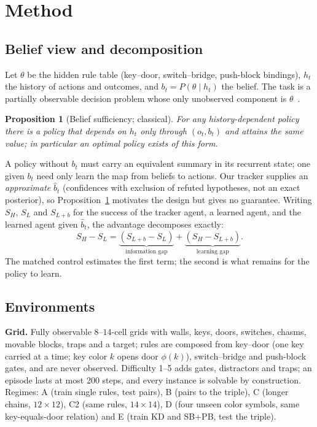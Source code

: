 \documentclass[conference]{IEEEtran}
\newtheorem{proposition}{Proposition}
\begin{document}
\section{Method}
\subsection{Belief view and decomposition}\label{sec:belief}
Let $\theta$ be the hidden rule table (key--door, switch--bridge, push-block bindings), $h_t$ the history of actions and outcomes, and $b_t=P(\theta\mid h_t)$ the belief. The task is a partially observable decision problem whose only unobserved component is $\theta$~\cite{kaelbling1998}.
\begin{proposition}[Belief sufficiency; classical]\label{prop:suff}
For any history-dependent policy there is a policy that depends on $h_t$ only through $(o_t,b_t)$ and attains the same value; in particular an optimal policy exists of this form.
\end{proposition}
A policy without $b_t$ must carry an equivalent summary in its recurrent state; one given $b_t$ need only learn the map from beliefs to actions. Our tracker supplies an \emph{approximate} $\hat b_t$ (confidences with exclusion of refuted hypotheses, not an exact posterior), so Proposition~\ref{prop:suff} motivates the design but gives no guarantee. Writing $S_H$, $S_L$ and $S_{L+b}$ for the success of the tracker agent, a learned agent, and the learned agent given $\hat b_t$, the advantage decomposes exactly:
\begin{equation}
S_H-S_L=\underbrace{(S_{L+b}-S_L)}_{\text{information gap}}+\underbrace{(S_H-S_{L+b})}_{\text{learning gap}}.\label{eq:dec}
\end{equation}
The matched control estimates the first term; the second is what remains for the policy to learn.

\subsection{Environments}
\textbf{Grid.} Fully observable $8$--$14$-cell grids with walls, keys, doors, switches, chasms, movable blocks, traps and a target; rules are composed from key--door (one key carried at a time; key color $k$ opens door $\phi(k)$), switch--bridge and push-block gates, and are never observed. Difficulty 1--5 adds gates, distractors and traps; an episode lasts at most 200 steps, and every instance is solvable by construction. Regimes: A (train single rules, test pairs), B (pairs to the triple), C (longer chains, $12{\times}12$), C2 (same rules, $14{\times}14$), D (four unseen color symbols, same key-equals-door relation) and E (train KD and SB+PB, test the triple).
\end{document}

